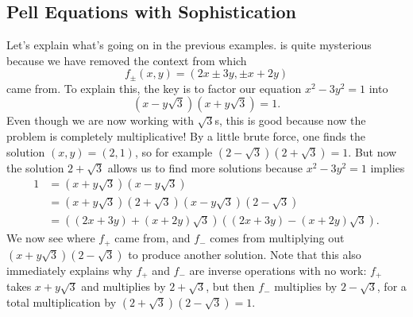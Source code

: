 \documentclass[../notes.tex]{subfiles}
\begin{document}
\subsection{Pell Equations with Sophistication} \label{subsec:intro-real-quad-for-pell}
Let's explain what's going on in the previous examples.  is quite mysterious because we have removed the context from which
\[f_{\pm}(x,y)=(2x\pm3y,\pm x+2y)\]
came from. To explain this, the key is to factor our equation $x^2-3y^2=1$ into
\[\left(x-y\sqrt3\right)\left(x+y\sqrt3\right)=1.\]
Even though we are now working with $\sqrt3$s, this is good because now the problem is completely multiplicative! By a little brute force, one finds the solution $(x,y)=(2,1)$, so for example $\left(2-\sqrt3\right)\left(2+\sqrt3\right)=1$. But now the solution $2+\sqrt3$ allows us to find more solutions because $x^2-3y^2=1$ implies
\begin{align*}
	1 &= \left(x+y\sqrt3\right)\left(x-y\sqrt3\right) \\
	&= \left(x+y\sqrt3\right)\left(2+\sqrt3\right)\left(x-y\sqrt3\right)\left(2-\sqrt3\right) \\
	&= \left((2x+3y)+(x+2y)\sqrt3\right)\left((2x+3y)-(x+2y)\sqrt3\right).
\end{align*}
We now see where $f_+$ came from, and $f_-$ comes from multiplying out $\left(x+y\sqrt3\right)\left(2-\sqrt3\right)$ to produce another solution. Note that this also immediately explains why $f_+$ and $f_-$ are inverse operations with no work: $f_+$ takes $x+y\sqrt3$ and multiplies by $2+\sqrt3$, but then $f_-$ multiplies by $2-\sqrt3$, for a total multiplication by $\left(2+\sqrt3\right)\left(2-\sqrt3\right)=1$.
\end{document}
